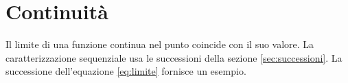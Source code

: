 \section{Continuità}
\label{sec:continuo}
Il limite di una funzione continua nel punto coincide con il suo valore.
La caratterizzazione sequenziale usa le successioni della sezione \ref{sec:successioni}.
La successione dell'equazione \eqref{eq:limite} fornisce un esempio.
